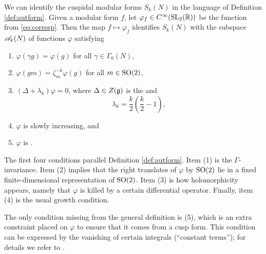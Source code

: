 \begin{example}\label{ex:holo.aut}
We can identify the cuspidal modular forms $S_{k} (N)$ in the language
of Definition \ref{def:autform}.  Given a modular form $f$, let
$\varphi_{f}\in C^{\infty} (\operatorname{SL}_{2} (\mathbb{R}))$ be the function from  
\eqref{eq:corresp}.  Then the map $f\mapsto \varphi_{f}$ identifies
$S_{k} (N)$ with the subspace $\mathscr A_{k} (N)$ of functions $\varphi$ satisfying
\begin{enumerate}
\item $\varphi (\gamma g) = \varphi (g)$ for all $\gamma \in \Gamma_{0} (N)$,
\item $\varphi (gm) = \zeta_{m}^{-k}\varphi (g)$ for all $m\in \operatorname{SO} (2)$,
\item $(\Delta +\lambda_{k})\varphi = 0$, where $\Delta \in Z (\mathfrak g)$
is the  and 
\[
\lambda_{k} = \frac{k}{2}\left(\frac{k}{2}-1 \right),
\]
\item $\varphi$ is slowly increasing, and 
\item $\varphi$ is .
\end{enumerate}


The first four conditions parallel Definition \ref{def:autform}.  Item (1) is the
$\Gamma$-invariance.  Item (2) implies that the right translates of
$\varphi$ by $\operatorname{SO} (2)$ lie in a fixed finite-dimensional
representation of $\operatorname{SO} (2)$.  Item (3) is how holomorphicity appears,
namely that $\varphi$ is killed by a certain differential operator.
Finally, item (4) is the usual growth condition.

The only condition missing from the general
definition is (5), which is an extra constraint placed on $\varphi$ to
ensure that it comes from a cusp form.  This condition can be
expressed by the vanishing of certain integrals (``constant terms'');
for details we refer to \cite{bump.autforms, gelbart}.
\end{example}

